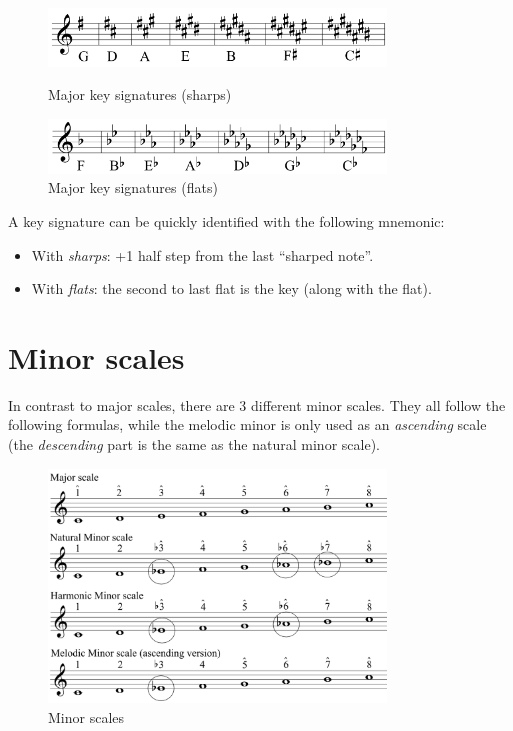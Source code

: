 \begin{figure}[h]
    \begin{center}
        \includegraphics[width=0.8\textwidth]{img/majorsharp}
        \caption{Major key signatures (sharps)}
        \includegraphics[width=0.8\textwidth]{img/majorflat}
        \caption{Major key signatures (flats)}
    \end{center}
\end{figure}
A key signature can be quickly identified with the following mnemonic:
\begin{itemize}
    \item With \emph{sharps}: +1 half step from the last ``sharped note''.
    \item With \emph{flats}: the second to last flat is the key (along with the flat).
\end{itemize}

\section{Minor scales}
In contrast to major scales, there are 3 different minor scales. They all follow the following formulas, while the melodic minor is only used as an \emph{ascending} scale (the \emph{descending} part is the same as the natural minor scale).
\begin{figure}
    \begin{center}
        \includegraphics[width=0.8\textwidth]{img/minorscales}
        \caption{Minor scales}
    \end{center}
\end{figure}

